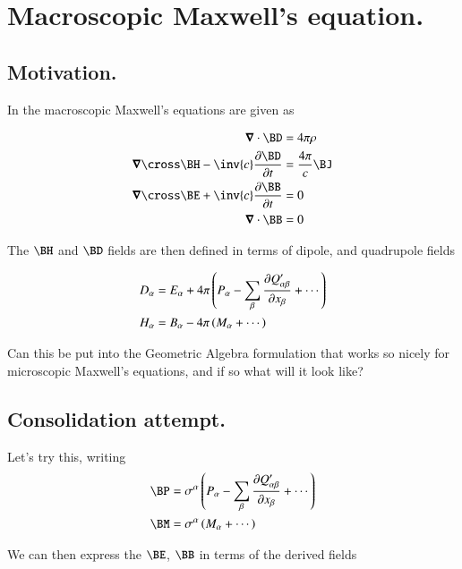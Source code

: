 \chapter{Macroscopic Maxwell's equation.}
\date{ May 28, 2009.  $RCSfile: macroscopicMaxwell.tex,v $ Last $Revision: 1.7 $ $Date: 2009/06/11 16:45:58 $ }

\section{Motivation. }

In \cite{jackson1975cew} the macroscopic Maxwell's equations are given as

\begin{align}\label{eqn:macroMax:MaxwellMixedFields}
\spacegrad \cdot \BD &= 4 \pi \rho \\
\spacegrad \cross \BH - \inv{c} \PD{t}{\BD} &= \frac{4 \pi}{c} \BJ \\
\spacegrad \cross \BE + \inv{c} \PD{t}{\BB} &= 0 \\
\spacegrad \cdot \BB &= 0
\end{align}

The $\BH$ and $\BD$ fields are then defined in terms of dipole, and quadrupole
fields

\begin{align}\label{eqn:macroMax:dipoleCoordinates}
D_\alpha &= E_\alpha + 4\pi \left( P_\alpha - \sum_\beta \PD{x_\beta}{Q'_{\alpha\beta}} + \cdots\right) \\
H_\alpha &= B_\alpha - 4\pi \left( M_\alpha + \cdots\right)
\end{align}

Can this be put into the Geometric Algebra formulation that works so
nicely for microscopic Maxwell's equations, and if so what will it look like?

\section{Consolidation attempt. }

Let's try this, writing
\begin{align}
\BP &= \sigma^\alpha \left( P_\alpha - \sum_\beta \PD{x_\beta}{Q'_{\alpha\beta}} + \cdots\right) \\
\BM &= \sigma^\alpha \left( M_\alpha + \cdots \right)
\end{align}

We can then express the $\BE$, $\BB$ in terms of the derived fields

